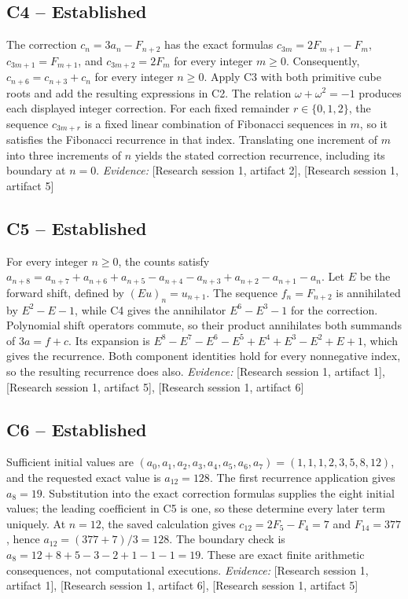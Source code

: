 \documentclass[11pt]{article}
\begin{document}
\begin{sloppypar}
\subsection{C4 -- Established}
The correction $c_n=3a_n-F_{n+2}$ has the exact formulas $c_{3m}=2F_{m+1}-F_m$, $c_{3m+1}=F_{m+1}$, and $c_{3m+2}=2F_m$ for every integer $m\geq 0$. Consequently, $c_{n+6}=c_{n+3}+c_n$ for every integer $n\geq 0$.
Apply C3 with both primitive cube roots and add the resulting expressions in C2. The relation $\omega+\omega^2=-1$ produces each displayed integer correction. For each fixed remainder $r\in\{0,1,2\}$, the sequence $c_{3m+r}$ is a fixed linear combination of Fibonacci sequences in $m$, so it satisfies the Fibonacci recurrence in that index. Translating one increment of $m$ into three increments of $n$ yields the stated correction recurrence, including its boundary at $n=0$.
\textit{Evidence: }[Research session 1, artifact 2], [Research session 1, artifact 5]
\subsection{C5 -- Established}
For every integer $n\geq 0$, the counts satisfy $a_{n+8}=a_{n+7}+a_{n+6}+a_{n+5}-a_{n+4}-a_{n+3}+a_{n+2}-a_{n+1}-a_n$.
Let $E$ be the forward shift, defined by $(Eu)_n=u_{n+1}$. The sequence $f_n=F_{n+2}$ is annihilated by $E^2-E-1$, while C4 gives the annihilator $E^6-E^3-1$ for the correction. Polynomial shift operators commute, so their product annihilates both summands of $3a=f+c$. Its expansion is $E^8-E^7-E^6-E^5+E^4+E^3-E^2+E+1$, which gives the recurrence. Both component identities hold for every nonnegative index, so the resulting recurrence does also.
\textit{Evidence: }[Research session 1, artifact 1], [Research session 1, artifact 5], [Research session 1, artifact 6]
\subsection{C6 -- Established}
Sufficient initial values are $(a_0,a_1,a_2,a_3,a_4,a_5,a_6,a_7)=(1,1,1,2,3,5,8,12)$, and the requested exact value is $a_{12}=128$. The first recurrence application gives $a_8=19$.
Substitution into the exact correction formulas supplies the eight initial values; the leading coefficient in C5 is one, so these determine every later term uniquely. At $n=12$, the saved calculation gives $c_{12}=2F_5-F_4=7$ and $F_{14}=377$, hence $a_{12}=(377+7)/3=128$. The boundary check is $a_8=12+8+5-3-2+1-1-1=19$. These are exact finite arithmetic consequences, not computational executions.
\textit{Evidence: }[Research session 1, artifact 1], [Research session 1, artifact 6], [Research session 1, artifact 5]

\end{sloppypar}
\end{document}
